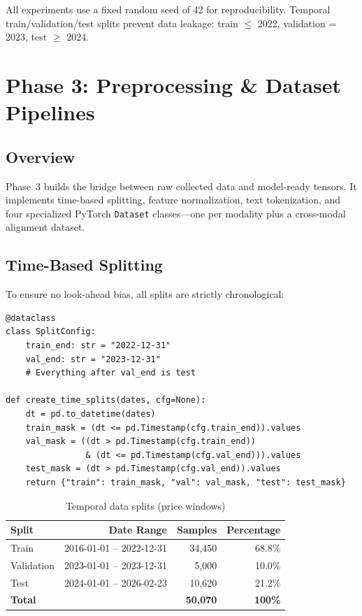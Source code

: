 \documentclass[12pt,a4paper]{article}
\begin{document}
\noindent All experiments use a fixed random seed of 42 for reproducibility. Temporal train/validation/test splits prevent data leakage: train $\leq$ 2022, validation = 2023, test $\geq$ 2024.

\section{Phase 3: Preprocessing \& Dataset Pipelines}
\label{sec:phase3}

\subsection{Overview}

Phase~3 builds the bridge between raw collected data and model-ready tensors. It implements time-based splitting, feature normalization, text tokenization, and four specialized PyTorch \texttt{Dataset} classes---one per modality plus a cross-modal alignment dataset.

\subsection{Time-Based Splitting}

To ensure no look-ahead bias, all splits are strictly chronological:

\begin{lstlisting}[caption={Temporal split configuration (\texttt{src/data/preprocessing.py})}]
@dataclass
class SplitConfig:
    train_end: str = "2022-12-31"
    val_end: str = "2023-12-31"
    # Everything after val_end is test

def create_time_splits(dates, cfg=None):
    dt = pd.to_datetime(dates)
    train_mask = (dt <= pd.Timestamp(cfg.train_end)).values
    val_mask = ((dt > pd.Timestamp(cfg.train_end))
                & (dt <= pd.Timestamp(cfg.val_end))).values
    test_mask = (dt > pd.Timestamp(cfg.val_end)).values
    return {"train": train_mask, "val": val_mask, "test": test_mask}
\end{lstlisting}

\begin{table}[H]
\centering
\begin{tabular}{lrrr}
\toprule
\textbf{Split} & \textbf{Date Range} & \textbf{Samples} & \textbf{Percentage} \\
\midrule
Train & 2016-01-01 -- 2022-12-31 & 34,450 & 68.8\% \\
Validation & 2023-01-01 -- 2023-12-31 & 5,000 & 10.0\% \\
Test & 2024-01-01 -- 2026-02-23 & 10,620 & 21.2\% \\
\midrule
\textbf{Total} & & \textbf{50,070} & \textbf{100\%} \\
\bottomrule
\end{tabular}
\caption{Temporal data splits (price windows)}
\label{tab:splits}
\end{table}
\end{document}
